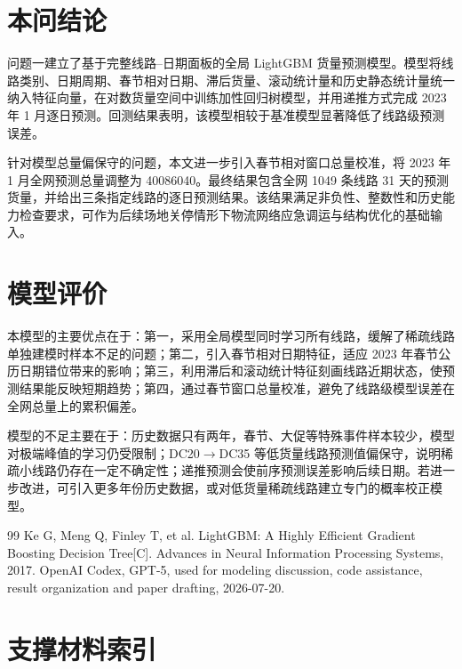\documentclass[UTF8,zihao=-4,a4paper,fontset=fandol]{ctexart}
\begin{document}
\section{本问结论}

问题一建立了基于完整线路--日期面板的全局 LightGBM 货量预测模型。模型将线路类别、日期周期、春节相对日期、滞后货量、滚动统计量和历史静态统计量统一纳入特征向量，在对数货量空间中训练加性回归树模型，并用递推方式完成 2023 年 1 月逐日预测。回测结果表明，该模型相较于基准模型显著降低了线路级预测误差。

针对模型总量偏保守的问题，本文进一步引入春节相对窗口总量校准，将 2023 年 1 月全网预测总量调整为 40086040。最终结果包含全网 1049 条线路 31 天的预测货量，并给出三条指定线路的逐日预测结果。该结果满足非负性、整数性和历史能力检查要求，可作为后续场地关停情形下物流网络应急调运与结构优化的基础输入。

\section{模型评价}

本模型的主要优点在于：第一，采用全局模型同时学习所有线路，缓解了稀疏线路单独建模时样本不足的问题；第二，引入春节相对日期特征，适应 2023 年春节公历日期错位带来的影响；第三，利用滞后和滚动统计特征刻画线路近期状态，使预测结果能反映短期趋势；第四，通过春节窗口总量校准，避免了线路级模型误差在全网总量上的累积偏差。

模型的不足主要在于：历史数据只有两年，春节、大促等特殊事件样本较少，模型对极端峰值的学习仍受限制；DC20$\rightarrow$DC35 等低货量线路预测值偏保守，说明稀疏小线路仍存在一定不确定性；递推预测会使前序预测误差影响后续日期。若进一步改进，可引入更多年份历史数据，或对低货量稀疏线路建立专门的概率校正模型。

\begin{thebibliography}{99}
   Ke G, Meng Q, Finley T, et al. LightGBM: A Highly Efficient Gradient Boosting Decision Tree[C]. Advances in Neural Information Processing Systems, 2017.
   OpenAI Codex, GPT-5, used for modeling discussion, code assistance, result organization and paper drafting, 2026-07-20.
\end{thebibliography}

\CumcmMainMatterEnd
\appendix
{}

\section{支撑材料索引}
\end{document}
